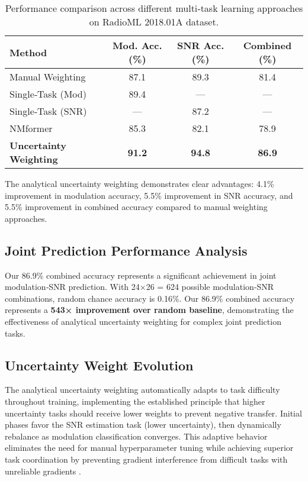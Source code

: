 \documentclass{ELSP}
\begin{document}
\begin{table}[H]
\centering
\begin{tabular}{lccc}
\toprule
\textbf{Method} & \textbf{Mod. Acc. (\%)} & \textbf{SNR Acc. (\%)} & \textbf{Combined (\%)} \\
\midrule
Manual Weighting & 87.1 & 89.3 & 81.4 \\
Single‑Task (Mod) & 89.4 & — & — \\
Single‑Task (SNR) & — & 87.2 & — \\
NMformer \cite{faysal2024nmformer} & 85.3 & 82.1 & 78.9 \\
\textbf{Uncertainty Weighting} & \textbf{91.2} & \textbf{94.8} & \textbf{86.9} \\
\bottomrule
\end{tabular}
\caption{Performance comparison across different multi‑task learning approaches on RadioML 2018.01A dataset.}
\label{tab:performance}
\end{table}

The analytical uncertainty weighting demonstrates clear advantages: 4.1\% improvement in modulation accuracy, 5.5\% improvement in SNR accuracy, and 5.5\% improvement in combined accuracy compared to manual weighting approaches.

\subsection{Joint Prediction Performance Analysis}

Our 86.9\% combined accuracy represents a significant achievement in joint modulation‑SNR prediction. With 24×26 = 624 possible modulation‑SNR combinations, random chance accuracy is 0.16\%. Our 86.9\% combined accuracy represents a \textbf{543× improvement over random baseline}, demonstrating the effectiveness of analytical uncertainty weighting for complex joint prediction tasks.

\subsection{Uncertainty Weight Evolution}

The analytical uncertainty weighting automatically adapts to task difficulty throughout training, implementing the established principle \cite{kendall2018multi} that higher uncertainty tasks should receive lower weights to prevent negative transfer. Initial phases favor the SNR estimation task (lower uncertainty), then dynamically rebalance as modulation classification converges. This adaptive behavior eliminates the need for manual hyperparameter tuning while achieving superior task coordination by preventing gradient interference from difficult tasks with unreliable gradients \cite{liu2024analytical}.
\end{document}
